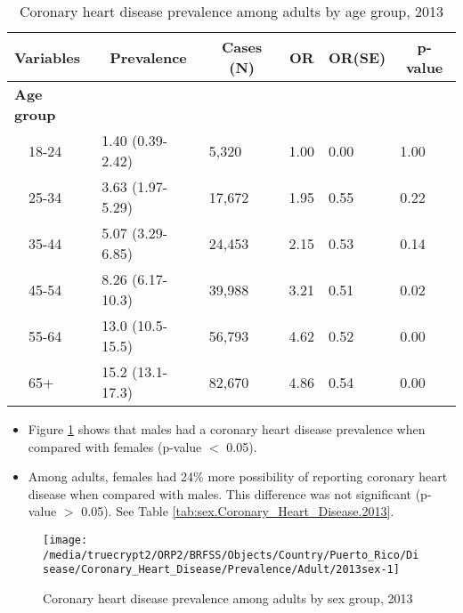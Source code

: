 \begin{table}[H]
\caption{Coronary heart disease prevalence  among adults by age group, 2013\label{tab:age.Coronary_Heart_Disease.2013}} 
\begin{center}
\begin{tabular}{llllll}
\hline\hline
\multicolumn{1}{l}{Variables}&\multicolumn{1}{c}{Prevalence}&\multicolumn{1}{c}{Cases (N)}&\multicolumn{1}{c}{OR}&\multicolumn{1}{c}{OR(SE)}&\multicolumn{1}{c}{p-value}\tabularnewline
\hline
{\bfseries Age group}&&&&&\tabularnewline
~~18-24&1.40 (0.39-2.42)& 5,320&1.00&0.00&1.00\tabularnewline
~~25-34&3.63 (1.97-5.29)&17,672&1.95&0.55&0.22\tabularnewline
~~35-44&5.07 (3.29-6.85)&24,453&2.15&0.53&0.14\tabularnewline
~~45-54&8.26 (6.17-10.3)&39,988&3.21&0.51&0.02\tabularnewline
~~55-64&13.0 (10.5-15.5)&56,793&4.62&0.52&0.00\tabularnewline
~~65+&15.2 (13.1-17.3)&82,670&4.86&0.54&0.00\tabularnewline
\hline
\end{tabular}\end{center}

\end{table}


\newpage
\begin{itemize}

\item Figure \ref{fig:sex.Coronary_Heart_Disease.2013} shows that males had a 
coronary heart disease prevalence when compared with females (p-value $<$ 0.05).


\item Among adults, females had 24\% more possibility of reporting coronary heart disease when compared with males. This difference was not significant (p-value $>$ 0.05). See Table \ref{tab:sex.Coronary_Heart_Disease.2013}.

\end{itemize}

\begin{figure}[H]
\caption{Coronary heart disease prevalence among adults by sex group, 
2013}
\begin{knitrout}
\color{fgcolor}

{\centering \texttt{[image: /media/truecrypt2/ORP2/BRFSS/Objects/Country/Puerto\_Rico/Disease/Coronary\_Heart\_Disease/Prevalence/Adult/2013sex-1]} 

}



\end{knitrout}
\label{fig:sex.Coronary_Heart_Disease.2013}
\end{figure}

